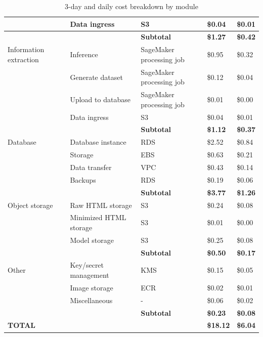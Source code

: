 \begin{table}[t]
\begin{tabularx}{\textwidth}{p{2.9cm} p{3.8cm} p{3.3cm} >{\raggedleft\arraybackslash}p{2.2cm} >{\raggedleft\arraybackslash}p{2.1cm}}
         & Data ingress & S3 & \$0.04 & \$0.01 \\
        \midrule
         &  & \textbf{Subtotal} & \textbf{\$1.27} & \textbf{\$0.42} \\
        \midrule
        Information extraction & Inference & SageMaker processing job & \$0.95 & \$0.32 \\
         & Generate dataset & SageMaker processing job & \$0.12 & \$0.04 \\
         & Upload to database & SageMaker processing job & \$0.01 & \$0.00 \\
         & Data ingress & S3 & \$0.04 & \$0.01 \\
        \midrule
         &  & \textbf{Subtotal} & \textbf{\$1.12} & \textbf{\$0.37} \\
        \midrule
        Database & Database instance & RDS & \$2.52 & \$0.84 \\
         & Storage & EBS & \$0.63 & \$0.21 \\
         & Data transfer & VPC & \$0.43 & \$0.14 \\
         & Backups & RDS & \$0.19 & \$0.06 \\
        \midrule
         &  & \textbf{Subtotal} & \textbf{\$3.77} & \textbf{\$1.26} \\
        \midrule
        Object storage & Raw HTML storage & S3 & \$0.24 & \$0.08 \\
         & Minimized HTML storage & S3 & \$0.01 & \$0.00 \\
         & Model storage & S3 & \$0.25 & \$0.08 \\
        \midrule
         &  & \textbf{Subtotal} & \textbf{\$0.50} & \textbf{\$0.17} \\
        \midrule
        Other & Key/secret management & KMS & \$0.15 & \$0.05 \\
         & Image storage & ECR & \$0.02 & \$0.01 \\
         & Miscellaneous & - & \$0.06 & \$0.02 \\
        \midrule
         &  & \textbf{Subtotal} & \textbf{\$0.23} & \textbf{\$0.08} \\
        \midrule
        \textbf{TOTAL} &  &  & \textbf{\$18.12} & \textbf{\$6.04} \\
        \bottomrule
    \end{tabularx}
    \caption{3-day and daily cost breakdown by module}
    \label{tab:system-cost-breakdown}
\end{table}


